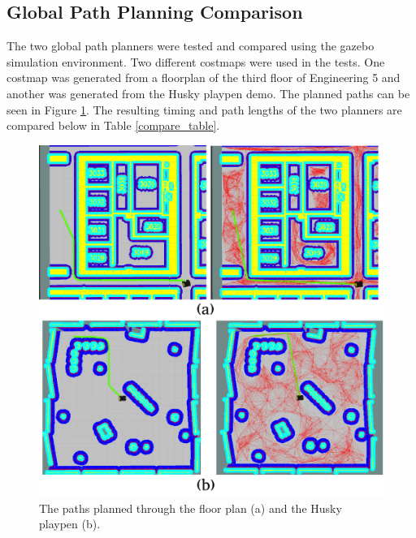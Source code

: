\documentclass[letterpaper, 10 pt, conference]{ieeeconf}  %
\begin{document}
\subsection{Global Path Planning Comparison}

The two global path planners were tested and compared using the gazebo simulation environment. Two different costmaps were used in the tests. One costmap was generated from a floorplan of the third floor of Engineering 5 and another was generated from the Husky playpen demo. The planned paths can be seen in Figure \ref{compare_combined}. The resulting timing and path lengths of the two planners are compared below in Table \ref{compare_table}.

\begin{figure}[!ht]
	\centering
	\includegraphics[width=1.0\columnwidth]{Figures/compare_combined}
	\caption{The paths planned through the floor plan (a) and the Husky playpen (b).}
	\label{compare_combined}
\end{figure}
\end{document}
